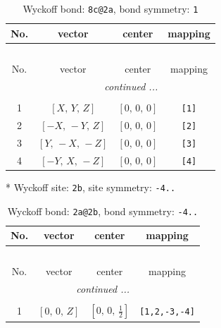 \documentclass[fleqn,8pt]{jsarticle}
\begin{document}
\renewcommand{\arraystretch}{1.2}
\begin{longtable}{cccc}
\caption{Wyckoff bond: {\tt 8c@2a}, bond symmetry: {\tt 1}}
 \\
 \hline \hline
No. & vector & center & mapping \\ \hline \endfirsthead

\multicolumn{3}{l}{\tablename\ \thetable{}} \\
 \hline \hline
No. & vector & center & mapping \\ \hline \endhead

 \hline \hline
\multicolumn{3}{r}{\footnotesize\it continued ...} \\ \endfoot

 \hline \hline
\multicolumn{3}{r}{} \\ \endlastfoot

1 & $\left[ X,\, Y,\, Z \right]$ & $\left[ 0,\, 0,\, 0 \right]$ & {\tt [1]} \\ \hline
2 & $\left[ - X,\, - Y,\, Z \right]$ & $\left[ 0,\, 0,\, 0 \right]$ & {\tt [2]} \\ \hline
3 & $\left[ Y,\, - X,\, - Z \right]$ & $\left[ 0,\, 0,\, 0 \right]$ & {\tt [3]} \\ \hline
4 & $\left[ - Y,\, X,\, - Z \right]$ & $\left[ 0,\, 0,\, 0 \right]$ & {\tt [4]} \\
\end{longtable}
* Wyckoff site: {\tt 2b}, site symmetry: {\tt -4..}
\renewcommand{\arraystretch}{1.2}
\begin{longtable}{cccc}
\caption{Wyckoff bond: {\tt 2a@2b}, bond symmetry: {\tt -4..}}
 \\
 \hline \hline
No. & vector & center & mapping \\ \hline \endfirsthead

\multicolumn{3}{l}{\tablename\ \thetable{}} \\
 \hline \hline
No. & vector & center & mapping \\ \hline \endhead

 \hline \hline
\multicolumn{3}{r}{\footnotesize\it continued ...} \\ \endfoot

 \hline \hline
\multicolumn{3}{r}{} \\ \endlastfoot

1 & $\left[ 0,\, 0,\, Z \right]$ & $\left[ 0,\, 0,\, \frac{1}{2} \right]$ & {\tt [1,2,-3,-4]} \\
\end{longtable}
\renewcommand{\arraystretch}{1.2}
\end{document}
